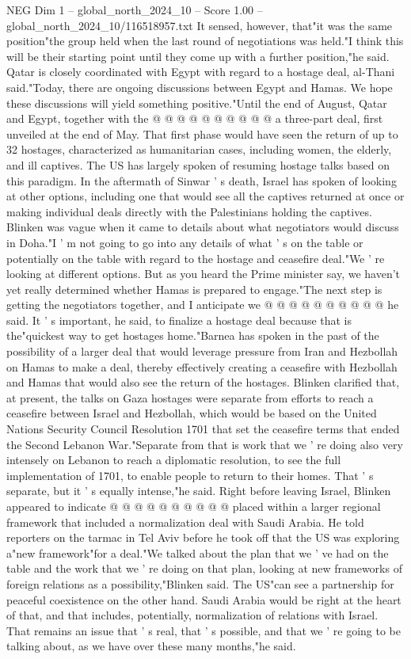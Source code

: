 \begin{textsample}{NEG Dim 1 – global\_north\_2024\_10 – Score 1.00 – global\_north\_2024\_10/116518957.txt}
It sensed, however, that"it was the same position"the group held when the last round of negotiations was held."I think this will be their starting point until they come up with a further position,"he said.
Qatar is closely coordinated with Egypt with regard to a hostage deal, al-Thani said."Today, there are ongoing discussions between Egypt and Hamas.
We hope these discussions will yield something positive."Until the end of August, Qatar and Egypt, together with the @ @ @ @ @ @ @ @ @ @ a three-part deal, first unveiled at the end of May.
That first phase would have seen the return of up to 32 hostages, characterized as humanitarian cases, including women, the elderly, and ill captives.
The US has largely spoken of resuming hostage talks based on this paradigm.
In the aftermath of Sinwar ' s death, Israel has spoken of looking at other options, including one that would see all the captives returned at once or making individual deals directly with the Palestinians holding the captives.
Blinken was vague when it came to details about what negotiators would discuss in Doha."I ' m not going to go into any details of what ' s on the table or potentially on the table with regard to the hostage and ceasefire deal."We ' re looking at different options.
But as you heard the Prime minister say, we haven't yet really determined whether Hamas is prepared to engage."The next step is getting the negotiators together, and I anticipate we @ @ @ @ @ @ @ @ @ @ he said.
It ' s important, he said, to finalize a hostage deal because that is the"quickest way to get hostages home."Barnea has spoken in the past of the possibility of a larger deal that would leverage pressure from Iran and Hezbollah on Hamas to make a deal, thereby effectively creating a ceasefire with Hezbollah and Hamas that would also see the return of the hostages.
Blinken clarified that, at present, the talks on Gaza hostages were separate from efforts to reach a ceasefire between Israel and Hezbollah, which would be based on the United Nations Security Council Resolution 1701 that set the ceasefire terms that ended the Second Lebanon War."Separate from that is work that we ' re doing also very intensely on Lebanon to reach a diplomatic resolution, to see the full implementation of 1701, to enable people to return to their homes.
That ' s separate, but it ' s equally intense,"he said.
Right before leaving Israel, Blinken appeared to indicate @ @ @ @ @ @ @ @ @ @ placed within a larger regional framework that included a normalization deal with Saudi Arabia.
He told reporters on the tarmac in Tel Aviv before he took off that the US was exploring a"new framework"for a deal."We talked about the plan that we ' ve had on the table and the work that we ' re doing on that plan, looking at new frameworks of foreign relations as a possibility,"Blinken said.
The US"can see a partnership for peaceful coexistence on the other hand.
Saudi Arabia would be right at the heart of that, and that includes, potentially, normalization of relations with Israel.
That remains an issue that ' s real, that ' s possible, and that we ' re going to be talking about, as we have over these many months,"he said.

\end{textsample}
